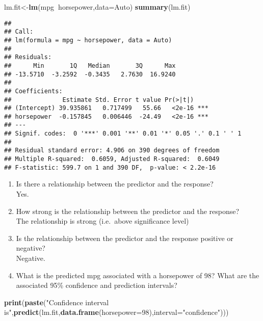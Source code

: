 \documentclass[]{article}
\newenvironment{Shaded}{\begin{snugshade}}{\end{snugshade}}
\newcommand{\KeywordTok}[1]{\textcolor[rgb]{0.13,0.29,0.53}{\textbf{#1}}}
\newcommand{\DataTypeTok}[1]{\textcolor[rgb]{0.13,0.29,0.53}{#1}}
\newcommand{\DecValTok}[1]{\textcolor[rgb]{0.00,0.00,0.81}{#1}}
\newcommand{\StringTok}[1]{\textcolor[rgb]{0.31,0.60,0.02}{#1}}
\newcommand{\OperatorTok}[1]{\textcolor[rgb]{0.81,0.36,0.00}{\textbf{#1}}}
\newcommand{\NormalTok}[1]{#1}
\begin{document}
\begin{Shaded}
\begin{Highlighting}[]
\NormalTok{lm.fit<-}\KeywordTok{lm}\NormalTok{(mpg}\OperatorTok{~}\NormalTok{horsepower,}\DataTypeTok{data=}\NormalTok{Auto)}
\KeywordTok{summary}\NormalTok{(lm.fit)}
\end{Highlighting}
\end{Shaded}

\begin{verbatim}
## 
## Call:
## lm(formula = mpg ~ horsepower, data = Auto)
## 
## Residuals:
##      Min       1Q   Median       3Q      Max 
## -13.5710  -3.2592  -0.3435   2.7630  16.9240 
## 
## Coefficients:
##              Estimate Std. Error t value Pr(>|t|)    
## (Intercept) 39.935861   0.717499   55.66   <2e-16 ***
## horsepower  -0.157845   0.006446  -24.49   <2e-16 ***
## ---
## Signif. codes:  0 '***' 0.001 '**' 0.01 '*' 0.05 '.' 0.1 ' ' 1
## 
## Residual standard error: 4.906 on 390 degrees of freedom
## Multiple R-squared:  0.6059, Adjusted R-squared:  0.6049 
## F-statistic: 599.7 on 1 and 390 DF,  p-value: < 2.2e-16
\end{verbatim}

\begin{enumerate}
\def\labelenumi{\roman{enumi}.}
\item
  Is there a relationship between the predictor and the response?\\
  Yes.
\item
  How strong is the relationship between the predictor and the
  response?\\
  The relationship is strong (i.e.~above significance level)
\item
  Is the relationship between the predictor and the response positive or
  negative?\\
  Negative.
\item
  What is the predicted mpg associated with a horsepower of 98? What are
  the associated 95\% confidence and prediction intervals?
\end{enumerate}

\begin{Shaded}
\begin{Highlighting}[]
\KeywordTok{print}\NormalTok{(}\KeywordTok{paste}\NormalTok{(}\StringTok{"Confidence interval is"}\NormalTok{,}\KeywordTok{predict}\NormalTok{(lm.fit,}\KeywordTok{data.frame}\NormalTok{(}\DataTypeTok{horsepower=}\DecValTok{98}\NormalTok{),}\DataTypeTok{interval=}\StringTok{"confidence"}\NormalTok{)))}
\end{Highlighting}
\end{Shaded}
\end{document}
